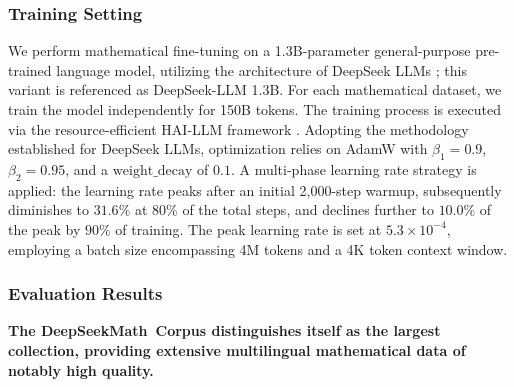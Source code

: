 \subsubsection{Training Setting}
\label{sec:quality-policy}
We perform mathematical fine-tuning on a 1.3B-parameter general-purpose pre-trained language model, utilizing the architecture of DeepSeek LLMs \citep{deepseek-llm}; this variant is referenced as DeepSeek-LLM 1.3B. For each mathematical dataset, we train the model independently for 150B tokens. The training process is executed via the resource-efficient HAI-LLM framework \citep{haillm}. Adopting the methodology established for DeepSeek LLMs, optimization relies on AdamW \citep{adamW} with $\beta_1=0.9$, $\beta_2=0.95$, and a $\mathrm{weight\_decay}$ of $0.1$. A multi-phase learning rate strategy is applied: the learning rate peaks after an initial 2,000-step warmup, subsequently diminishes to $31.6\%$ at $80\%$ of the total steps, and declines further to $10.0\%$ of the peak by $90\%$ of training. The peak learning rate is set at $5.3\times 10^{-4}$, employing a batch size encompassing 4M tokens and a 4K token context window.

\subsubsection{Evaluation Results}

\textbf{The DeepSeekMath~Corpus distinguishes itself as the largest collection, providing extensive multilingual mathematical data of notably high quality.}

